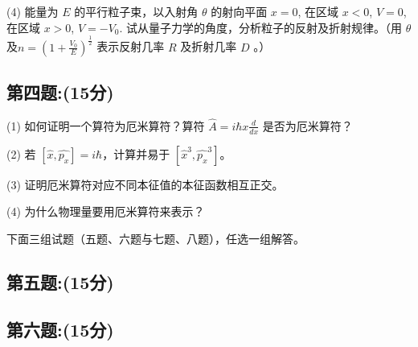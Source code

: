 (4) 
能量为 $E$ 的平行粒子束，以入射角 $\theta$ 的射向平面 $x = 0$, 在区域 $x < 0$, $V = 0$, 在区域 $x > 0$, $V = -V_0$. 试从量子力学的角度，分析粒子的反射及折射规律。（用 $\theta$ 及$n = \left( 1 + \frac{V_0}{E} \right)^{\frac{1}{2}}$
表示反射几率 $R$ 及折射几率 $D$ 。）
\subsection{第四题:(15分)}
(1) 如何证明一个算符为厄米算符？算符 $\hat{A} = i \hbar x \frac{d}{dx}$ 是否为厄米算符？

(2) 若 $[\hat{x}, \hat{p_x}] = i\hbar$，计算并易于 $[\hat{x}^3, \hat{p_x}^3]$。

(3) 证明厄米算符对应不同本征值的本征函数相互正交。

(4) 为什么物理量要用厄米算符来表示？

下面三组试题（五题、六题与七题、八题），任选一组解答。
\subsection{第五题:(15分)}

\subsection{第六题:(15分)}